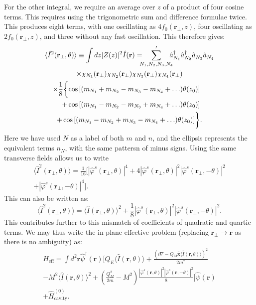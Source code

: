 \documentclass[twocolumn]{revtex4-1}
\renewcommand{\vec}[1]{\mathbf{#1}}
\begin{document}
For the other integral, we require an average over $z$ of
a product of four cosine terms. This requires using the trigonometric
sum and difference formulae twice. This produces eight terms,
with one oscillating as $4f_0(\vec{r}_\perp,z)$, 
four oscillating as $2f_0(\vec{r}_\perp,z)$, 
and three without any fast oscillation. This therefore gives:
\begin{multline*}
  \langle \hat{I}^2(\vec{r}_\perp,\theta) \rangle 
  \equiv
  \int dz |Z(z)|^2 \hat{I}(\vec{r})
  = \!\!\!\!\sum^\prime_{N_1,N_2,N_3,N_4}\!\!\!\!
  \hat{a}^\dagger_{N_1}
  \hat{a}^\dagger_{N_2}
  \hat{a}^{}_{N_3}
  \hat{a}^{}_{N_4}
  \\
  \times
  \chi_{N_1}(\vec{r}_\perp)
  \chi_{N_2}(\vec{r}_\perp)
  \chi_{N_3}(\vec{r}_\perp)
  \chi_{N_4}(\vec{r}_\perp)
  \\\times
  \frac{1}{8} 
  \biggl\{
  \shoveright{
  \cos\left[(m_{N_1} + m_{N_2} -m_{N_3} - m_{N_4}+\ldots)\theta(z_0)\right]}
  \phantom{\bigr\}.}
  \\\shoveright{+
  \cos\left[(m_{N_1} - m_{N_2} -m_{N_3} + m_{N_4}+\ldots)\theta(z_0)\right]}
  \phantom{\bigr\}.}
  \\+
  \cos\left[(m_{N_1} - m_{N_2} +m_{N_3} - m_{N_4}+\ldots)\theta(z_0)\right]
  \biggr\}.
\end{multline*}
Here we have used $N$ as a label of both $m$ and $n$, and the ellipsis
represents the equivalent terms $n_{N}$, with the same pattersn of
minus signs.  Using the same transverse fields allows us to write 
\begin{multline}
  \langle \hat{I}^2(\vec{r}_\perp,\theta) \rangle
  = \frac{1}{16}\biggl[
  |\hat{\varphi}^s(\vec{r}_\perp,\theta)|^4
  +
  4|\hat{\varphi}^s(\vec{r}_\perp,\theta)|^2
  |\hat{\varphi}^{s}(\vec{r}_\perp,-\theta)|^2
  \\+
  |\hat{\varphi}^{s}(\vec{r}_\perp,-\theta)|^4
  \biggr].
\end{multline}
This can also be written as:
\begin{displaymath}
  \langle \hat{I}^2(\vec{r}_\perp,\theta) \rangle
  = 
  \langle \hat{I}(\vec{r}_\perp,\theta) \rangle^2
  + \frac{1}{8}
  |\hat{\varphi}^s(\vec{r}_\perp,\theta)|^2
  |\hat{\varphi}^{s}(\vec{r}_\perp,-\theta)|^2.
\end{displaymath}
This contributes further to this mismatch of coefficients of
quadratic and quartic terms.  We may thus write the in-plane
effective problem (replacing $\vec{r}_\perp \to \vec{r}$ as
there is no ambiguity) as:
\begin{multline}
  H_{\text{eff}} 
  =
  \int d^2\vec{r}
  \hat{\psi}^\dagger(\vec{r})
  \Biggl[
    Q_E \langle\hat{I}(\vec{r},\theta)\rangle
    +
    \frac{\left(i \nabla - 
        Q_M \hat{\vec{x}} \langle\hat{I}(\vec{r},\theta)\rangle \right)^2}{2m^\ast} 
    \\
    - M^2 \langle\hat{I}(\vec{r},\theta)\rangle^2
    + \left( \frac{Q_M^2}{2m} - M^2\right)\frac{
  |\hat{\varphi}^s(\vec{r},\theta)|^2
  |\hat{\varphi}^{s}(\vec{r},-\theta)|^2}{8}
  \Biggr]
  \hat{\psi}^{}(\vec{r})
  \\+ \hat{H}^{(0)}_{\text{cavity}}.
\end{multline}
\end{document}
